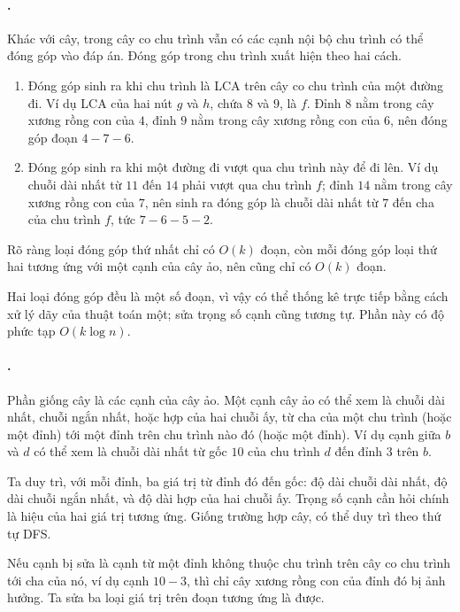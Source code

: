 \documentclass[11pt]{article}
\begin{document}
\paragraph{.}
Khác với cây, trong cây co chu trình vẫn có các cạnh nội bộ chu trình có thể
đóng góp vào đáp án. Đóng góp trong chu trình xuất hiện theo hai cách.

\begin{enumerate}
  \item Đóng góp sinh ra khi chu trình là LCA trên cây co chu trình của một
  đường đi. Ví dụ LCA của hai nút \(g\) và \(h\), chứa \(8\) và \(9\), là
  \(f\). Đỉnh \(8\) nằm trong cây xương rồng con của \(4\), đỉnh \(9\) nằm
  trong cây xương rồng con của \(6\), nên đóng góp đoạn \(4-7-6\).
  \item Đóng góp sinh ra khi một đường đi vượt qua chu trình này để đi lên.
  Ví dụ chuỗi dài nhất từ \(11\) đến \(14\) phải vượt qua chu trình \(f\);
  đỉnh \(14\) nằm trong cây xương rồng con của \(7\), nên sinh ra đóng góp là
  chuỗi dài nhất từ \(7\) đến cha của chu trình \(f\), tức \(7-6-5-2\).
\end{enumerate}

Rõ ràng loại đóng góp thứ nhất chỉ có \(O(k)\) đoạn, còn mỗi đóng góp loại thứ
hai tương ứng với một cạnh của cây ảo, nên cũng chỉ có \(O(k)\) đoạn.

Hai loại đóng góp đều là một số đoạn, vì vậy có thể thống kê trực tiếp bằng
cách xử lý dãy của thuật toán một; sửa trọng số cạnh cũng tương tự. Phần này
có độ phức tạp \(O(k\log n)\).

\paragraph{.}
Phần giống cây là các cạnh của cây ảo. Một cạnh cây ảo có thể xem là chuỗi dài
nhất, chuỗi ngắn nhất, hoặc hợp của hai chuỗi ấy, từ cha của một chu trình
(hoặc một đỉnh) tới một đỉnh trên chu trình nào đó (hoặc một đỉnh). Ví dụ cạnh
giữa \(b\) và \(d\) có thể xem là chuỗi dài nhất từ gốc \(10\) của chu trình
\(d\) đến đỉnh \(3\) trên \(b\).

Ta duy trì, với mỗi đỉnh, ba giá trị từ đỉnh đó đến gốc: độ dài chuỗi dài
nhất, độ dài chuỗi ngắn nhất, và độ dài hợp của hai chuỗi ấy. Trọng số cạnh
cần hỏi chính là hiệu của hai giá trị tương ứng. Giống trường hợp cây, có thể
duy trì theo thứ tự DFS.

Nếu cạnh bị sửa là cạnh từ một đỉnh không thuộc chu trình trên cây co chu
trình tới cha của nó, ví dụ cạnh \(10-3\), thì chỉ cây xương rồng con của đỉnh
đó bị ảnh hưởng. Ta sửa ba loại giá trị trên đoạn tương ứng là được.
\end{document}
